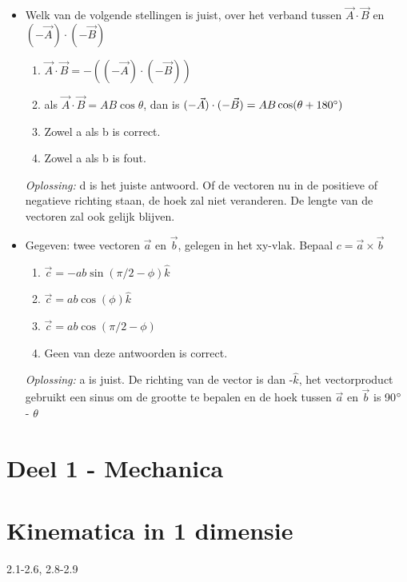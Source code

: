 \documentclass[12pt,a4paper]{article}
\begin{document}
\begin{itemize}
        \item Welk van de volgende stellingen is juist, over het verband tussen \(\vec{A} \cdot \vec{B}\) en \((-\vec{A}) \cdot (-\vec{B})\)
        \begin{enumerate}
            [label=\alph*)]
            \item \(\vec{A} \cdot \vec{B} = -((-\vec{A})\cdot(-\vec{B}))\)
            \item als \(\vec{A} \cdot \vec{B} = AB\cos\theta \), dan is \((-\vec{A}) \cdot (-\vec{B}) = AB\cos(\theta + 180\degree)\)
            \item Zowel a als b is correct.
            \item Zowel a als b is fout.
        \end{enumerate}
        \textit{Oplossing:} d is het juiste antwoord.
        Of de vectoren nu in de positieve of negatieve richting staan, de hoek zal niet veranderen.
        De lengte van de vectoren zal ook gelijk blijven.

        \item Gegeven: twee vectoren $\vec{a}$ en $\vec{b}$, gelegen in het xy-vlak.
        Bepaal \(c = \vec{a} \times \vec{b}\)
        \begin{enumerate}
            [label=\alph*)]
            \item \(\vec{c} = - ab \sin(\pi/2 - \phi)\hat{k}\)
            \item \(\vec{c} = ab \cos(\phi)\hat{k}\)
            \item \(\vec{c} = ab \cos(\pi/2 - \phi)\)
            \item Geen van deze antwoorden is correct.
        \end{enumerate}
        \textit{Oplossing:} a is juist. De richting van de vector is dan -$\hat{k}$, het vectorproduct gebruikt een sinus om de grootte te bepalen en de hoek tussen $\vec{a}$ en $\vec{b}$ is 90$\degree$ - $\theta$
    \end{itemize}

	\newpage
    \section{Deel 1 - Mechanica}


    \section{Kinematica in 1 dimensie}
    2.1-2.6, 2.8-2.9
\end{document}
